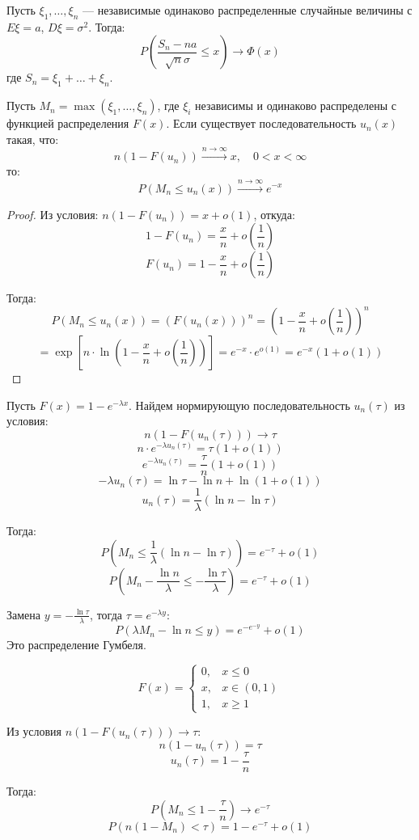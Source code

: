 \begin{theorem}
Пусть $\xi_1, \dots, \xi_n$ --- независимые одинаково распределенные случайные величины с $E\xi = a$, $D\xi = \sigma^2$.
Тогда:
$$ P\left(\frac{S_n - na}{\sqrt{n}\sigma} \le x\right) \to \Phi(x) $$
где $S_n = \xi_1 + \dots + \xi_n$.
\end{theorem}

\begin{theorem}
\leavevmode
Пусть $M_n = \max(\xi_1, \dots, \xi_n)$, где $\xi_i$ независимы и одинаково распределены с функцией распределения $F(x)$.
Если существует последовательность $u_n(x)$ такая, что:
$$ n(1 - F(u_n)) \xrightarrow{n \to \infty} x, \quad 0 < x < \infty $$
то:
$$ P(M_n \le u_n(x)) \xrightarrow{n \to \infty} e^{-x} $$
\end{theorem}

\begin{proof}
Из условия: $n(1 - F(u_n)) = x + o(1)$, откуда:
$$ 1 - F(u_n) = \frac{x}{n} + o\left(\frac{1}{n}\right) $$
$$ F(u_n) = 1 - \frac{x}{n} + o\left(\frac{1}{n}\right) $$

Тогда:
$$ P(M_n \le u_n(x)) = (F(u_n(x)))^n = \left(1 - \frac{x}{n} + o\left(\frac{1}{n}\right)\right)^n $$
$$ = \exp\left[n \cdot \ln\left(1 - \frac{x}{n} + o\left(\frac{1}{n}\right)\right)\right] = e^{-x} \cdot e^{o(1)} = e^{-x}(1 + o(1)) $$
\end{proof}

\begin{example}
Пусть $F(x) = 1 - e^{-\lambda x}$.
Найдем нормирующую последовательность $u_n(\tau)$ из условия:
$$ n(1 - F(u_n(\tau))) \to \tau $$
$$ n \cdot e^{-\lambda u_n(\tau)} = \tau(1 + o(1)) $$
$$ e^{-\lambda u_n(\tau)} = \frac{\tau}{n}(1 + o(1)) $$
$$ -\lambda u_n(\tau) = \ln\tau - \ln n + \ln(1 + o(1)) $$
$$ u_n(\tau) = \frac{1}{\lambda}(\ln n - \ln\tau) $$

Тогда:
$$ P\left(M_n \le \frac{1}{\lambda}(\ln n - \ln\tau)\right) = e^{-\tau} + o(1) $$
$$ P\left(M_n - \frac{\ln n}{\lambda} \le -\frac{\ln\tau}{\lambda}\right) = e^{-\tau} + o(1) $$

Замена $y = -\frac{\ln\tau}{\lambda}$, тогда $\tau = e^{-\lambda y}$:
$$ P\left(\lambda M_n - \ln n \le y\right) = e^{-e^{-y}} + o(1) $$
Это распределение Гумбеля.
\end{example}

\begin{example}
$$ F(x) = \begin{cases} 0, & x \le 0 \\ x, & x \in (0, 1) \\ 1, & x \ge 1 \end{cases} $$

Из условия $n(1 - F(u_n(\tau))) \to \tau$:
$$ n(1 - u_n(\tau)) = \tau $$
$$ u_n(\tau) = 1 - \frac{\tau}{n} $$

Тогда:
$$ P\left(M_n \le 1 - \frac{\tau}{n}\right) \to e^{-\tau} $$
$$ P\left(n(1 - M_n) < \tau\right) = 1 - e^{-\tau} + o(1) $$
\end{example}

